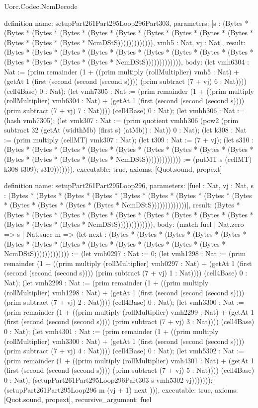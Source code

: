 \begin{lexlean}{Uorc.Codec.NcmDecode}
\begin{semanticmodule}
definition{
  name: setupPart261Part295Loop296Part303,
  parameters: [s : (Bytes * (Bytes * (Bytes * (Bytes * (Bytes * (Bytes * (Bytes * (Bytes * (Bytes * (Bytes * (Bytes * (Bytes * (Bytes * NcmDStS))))))))))))), vmh5 : Nat, vj : Nat],
  result: (Bytes * (Bytes * (Bytes * (Bytes * (Bytes * (Bytes * (Bytes * (Bytes * (Bytes * (Bytes * (Bytes * (Bytes * (Bytes * NcmDStS))))))))))))),
  body: (let vmh6304 : Nat := (prim remainder (1 + ((prim multiply (rollMultiplier) vmh5 : Nat) + (getAt 1 (first (second (second (second s)))) (prim subtract (7 + vj) 6 : Nat)))) (cell4Base) 0 : Nat); (let vmh7305 : Nat := (prim remainder (1 + ((prim multiply (rollMultiplier) vmh6304 : Nat) + (getAt 1 (first (second (second (second s)))) (prim subtract (7 + vj) 7 : Nat)))) (cell4Base) 0 : Nat); (let vmhh306 : Nat := (hash vmh7305); (let vmk307 : Nat := (prim quotient vmhh306 (pow2 (prim subtract 32 (getAt (widthMb) (first s) (atMb)) : Nat)) 0 : Nat); (let k308 : Nat := (prim multiply (cellMT) vmk307 : Nat); (let t309 : Nat := (7 + vj); (let s310 : (Bytes * (Bytes * (Bytes * (Bytes * (Bytes * (Bytes * (Bytes * (Bytes * (Bytes * (Bytes * (Bytes * (Bytes * (Bytes * NcmDStS))))))))))))) := (putMT s (cellMT) k308 t309); s310))))))),
  executable: true,
  axioms: [Quot.sound, propext]
}

definition{
  name: setupPart261Part295Loop296,
  parameters: [fuel : Nat, vj : Nat, s : (Bytes * (Bytes * (Bytes * (Bytes * (Bytes * (Bytes * (Bytes * (Bytes * (Bytes * (Bytes * (Bytes * (Bytes * (Bytes * NcmDStS)))))))))))))],
  result: (Bytes * (Bytes * (Bytes * (Bytes * (Bytes * (Bytes * (Bytes * (Bytes * (Bytes * (Bytes * (Bytes * (Bytes * (Bytes * NcmDStS))))))))))))),
  body: (match fuel
    | Nat.zero => s
    | Nat.succ m => (let next : (Bytes * (Bytes * (Bytes * (Bytes * (Bytes * (Bytes * (Bytes * (Bytes * (Bytes * (Bytes * (Bytes * (Bytes * (Bytes * NcmDStS))))))))))))) := (let vmh0297 : Nat := 0; (let vmh1298 : Nat := (prim remainder (1 + ((prim multiply (rollMultiplier) vmh0297 : Nat) + (getAt 1 (first (second (second (second s)))) (prim subtract (7 + vj) 1 : Nat)))) (cell4Base) 0 : Nat); (let vmh2299 : Nat := (prim remainder (1 + ((prim multiply (rollMultiplier) vmh1298 : Nat) + (getAt 1 (first (second (second (second s)))) (prim subtract (7 + vj) 2 : Nat)))) (cell4Base) 0 : Nat); (let vmh3300 : Nat := (prim remainder (1 + ((prim multiply (rollMultiplier) vmh2299 : Nat) + (getAt 1 (first (second (second (second s)))) (prim subtract (7 + vj) 3 : Nat)))) (cell4Base) 0 : Nat); (let vmh4301 : Nat := (prim remainder (1 + ((prim multiply (rollMultiplier) vmh3300 : Nat) + (getAt 1 (first (second (second (second s)))) (prim subtract (7 + vj) 4 : Nat)))) (cell4Base) 0 : Nat); (let vmh5302 : Nat := (prim remainder (1 + ((prim multiply (rollMultiplier) vmh4301 : Nat) + (getAt 1 (first (second (second (second s)))) (prim subtract (7 + vj) 5 : Nat)))) (cell4Base) 0 : Nat); (setupPart261Part295Loop296Part303 s vmh5302 vj))))))); (setupPart261Part295Loop296 m (vj + 1) next ))),
  executable: true,
  axioms: [Quot.sound, propext],
  recursive_argument: fuel
}


\end{semanticmodule}
\end{lexlean}
